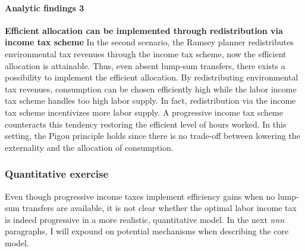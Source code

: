 \paragraph{Analytic findings 3}
\textbf{Efficient allocation can be implemented through redistribution via income tax scheme}
In the second scenario, the Ramsey planner redistributes environmental tax revenues through the income tax scheme, now the efficient allocation is attainable. Thus, even absent lump-sum transfers, there exists a possibility to implement the efficient allocation. By redistributing environmental tax revenues, consumption can be chosen efficiently high while the labor income tax scheme handles too high labor supply. In fact, redistribution via the income tax scheme incentivizes more labor supply. A progressive income tax scheme counteracts this tendency restoring the efficient level of hours worked. 
In this setting, the Pigou principle holds since there is no trade-off between lowering the externality and the allocation of consumption.
% 
% 
% 


\subsubsection*{Quantitative exercise}
Even though progressive income taxes implement efficiency gains when no lump-sum transfers are available, it is not clear whether the optimal labor income tax is indeed progressive in a more realistic, quantitative model. In the next \textit{nnn} paragraphs,  I will expound on potential mechanisms when describing the core model.

